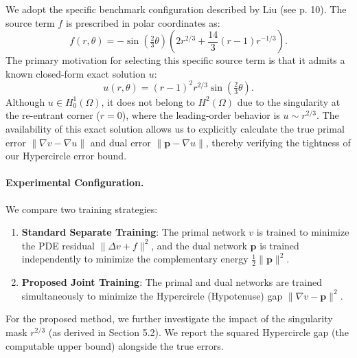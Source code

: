 \documentclass[12pt, a4paper]{article}
\begin{document}
We adopt the specific benchmark configuration described by Liu \cite{liu2023guaranteed} (see p. 10). The source term $f$ is prescribed in polar coordinates as:
\begin{equation}
\label{eq:lshape_rhs_f}
    f(r,\theta) = -\sin\!\left(\tfrac{2}{3}\theta\right)\left( 2r^{2/3} + \frac{14}{3}(r-1)r^{-1/3} \right).
\end{equation}
The primary motivation for selecting this specific source term is that it admits a known closed-form exact solution $u$:
\begin{equation}
\label{eq:lshape_exact_u}
    u(r,\theta) = (r-1)^2 r^{2/3}\sin\!\left(\tfrac{2}{3}\theta\right).
\end{equation}
Although $u \in H_0^1(\Omega)$, it does not belong to $H^2(\Omega)$ due to the singularity at the re-entrant corner ($r=0$), where the leading-order behavior is $u \sim r^{2/3}$. 
The availability of this exact solution allows us to explicitly calculate the true primal error $\|\nabla v - \nabla u\|$ and dual error $\|\mathbf{p} - \nabla u\|$, thereby verifying the tightness of our Hypercircle error bound.

\paragraph{Experimental Configuration.}
We compare two training strategies:
\begin{enumerate}
    \item \textbf{Standard Separate Training}: The primal network $v$ is trained to minimize the PDE residual $\|\Delta v + f\|^2$, and the dual network $\mathbf{p}$ is trained independently to minimize the complementary energy $\frac{1}{2}\|\mathbf{p}\|^2$.
    \item \textbf{Proposed Joint Training}: The primal and dual networks are trained simultaneously to minimize the Hypercircle (Hypotenuse) gap $\|\nabla v - \mathbf{p}\|^2$.
\end{enumerate}
For the proposed method, we further investigate the impact of the singularity mask $r^{2/3}$ (as derived in Section 5.2). We report the squared Hypercircle gap (the computable upper bound) alongside the true errors.
\end{document}
